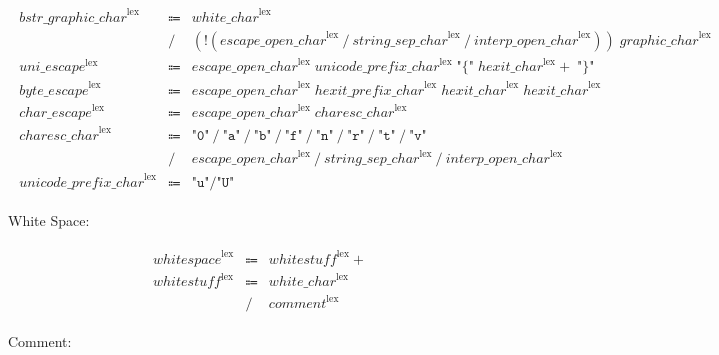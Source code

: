 \begin{align*}
\begin{array}{rcll}
        \mathit{bstr\_graphic\_char}^\mathrm{lex}
        &\Coloneq &\mathit{white\_char}^\mathrm{lex} \\
        &\mathrel{/} &(\mathop{!} (\mathit{escape\_open\_char}^\mathrm{lex} \mathrel{/} \mathit{string\_sep\_char}^\mathrm{lex} \mathrel{/} \mathit{interp\_open\_char}^\mathrm{lex}))\; \mathit{graphic\_char}^\mathrm{lex} \\
        \mathit{uni\_escape}^\mathrm{lex}
        &\Coloneq &\mathit{escape\_open\_char}^\mathrm{lex}\; \mathit{unicode\_prefix\_char}^\mathrm{lex}\; \texttt{"\{"}\; \mathit{hexit\_char}^\mathrm{lex}{+}\; \texttt{"\}"} \\
        \mathit{byte\_escape}^\mathrm{lex}
        &\Coloneq &\mathit{escape\_open\_char}^\mathrm{lex}\; \mathit{hexit\_prefix\_char}^\mathrm{lex}\; \mathit{hexit\_char}^\mathrm{lex}\; \mathit{hexit\_char}^\mathrm{lex} \\
        \mathit{char\_escape}^\mathrm{lex}
        &\Coloneq &\mathit{escape\_open\_char}^\mathrm{lex}\; \mathit{charesc\_char}^\mathrm{lex} \\
        \mathit{charesc\_char}^\mathrm{lex}
        &\Coloneq &\texttt{"0"} \mathrel{/} \texttt{"a"} \mathrel{/} \texttt{"b"} \mathrel{/} \texttt{"f"} \mathrel{/} \texttt{"n"} \mathrel{/} \texttt{"r"} \mathrel{/} \texttt{"t"} \mathrel{/} \texttt{"v"} \\
        &\mathrel{/} &\mathit{escape\_open\_char}^\mathrm{lex} \mathrel{/} \mathit{string\_sep\_char}^\mathrm{lex} \mathrel{/} \mathit{interp\_open\_char}^\mathrm{lex} \\
        \mathit{unicode\_prefix\_char}^\mathrm{lex}
        &\Coloneq &\texttt{"u"} \mathrel{/} \texttt{"U"}
    \end{array}
\end{align*}

White Space:

\begin{align*}
    \begin{array}{rcll}
        \mathit{whitespace}^\mathrm{lex}
        &\Coloneq &\mathit{whitestuff}^\mathrm{lex}{+} \\
        \mathit{whitestuff}^\mathrm{lex}
        &\Coloneq &\mathit{white\_char}^\mathrm{lex} \\
        &\mathrel{/} &\mathit{comment}^\mathrm{lex}
    \end{array}
\end{align*}

Comment:

